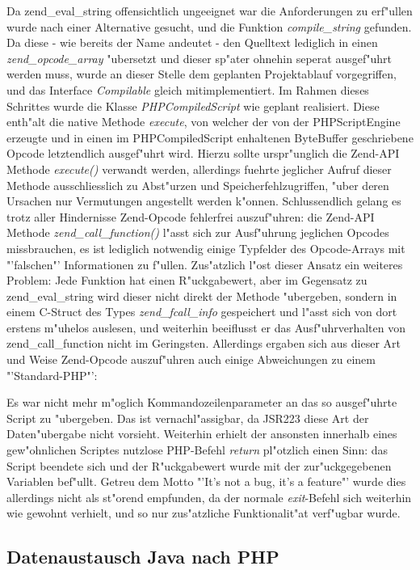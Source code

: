 Da zend\_eval\_string offensichtlich ungeeignet war die Anforderungen zu erf"ullen wurde nach einer Alternative gesucht, und
die Funktion \emph{compile\_string} gefunden. Da diese - wie bereits der Name andeutet - den Quelltext lediglich in einen
\emph{zend\_opcode\_array} "ubersetzt und dieser sp"ater ohnehin seperat ausgef"uhrt werden muss, wurde an dieser Stelle dem
geplanten Projektablauf vorgegriffen, und das Interface \emph{Compilable} gleich mitimplementiert. Im Rahmen dieses Schrittes
wurde die Klasse \emph{PHPCompiledScript} wie geplant realisiert. Diese enth"alt die native Methode \emph{execute}, von welcher
der von der PHPScriptEngine erzeugte und in einen im PHPCompiledScript enhaltenen ByteBuffer geschriebene Opcode letztendlich
ausgef"uhrt wird. Hierzu sollte urspr"unglich die Zend-API Methode \emph{execute()} verwandt werden, allerdings fuehrte jeglicher
Aufruf dieser Methode ausschliesslich zu Abst"urzen und Speicherfehlzugriffen, "uber deren Ursachen nur Vermutungen angestellt
werden k"onnen. Schlussendlich gelang es trotz aller Hindernisse Zend-Opcode fehlerfrei auszuf"uhren: die Zend-API Methode
\emph{zend\_call\_function()} l"asst sich zur Ausf"uhrung jeglichen Opcodes missbrauchen, es ist lediglich notwendig einige
Typfelder des Opcode-Arrays mit "'falschen"' Informationen zu f"ullen. Zus"atzlich l"ost dieser Ansatz ein weiteres Problem:
Jede Funktion hat einen R"uckgabewert, aber im Gegensatz zu zend\_eval\_string wird dieser nicht direkt der Methode "ubergeben,
sondern in einem C-Struct des Types \emph{zend\_fcall\_info} gespeichert und l"asst sich von dort erstens m"uhelos auslesen, und
weiterhin beeiflusst er das Ausf"uhrverhalten von zend\_call\_function nicht im Geringsten. Allerdings ergaben sich aus dieser 
Art und Weise Zend-Opcode auszuf"uhren auch einige Abweichungen zu einem "'Standard-PHP"':

Es war nicht mehr m"oglich Kommandozeilenparameter an das so ausgef"uhrte Script zu "ubergeben. Das ist vernachl"assigbar, da
JSR223 diese Art der Daten"ubergabe nicht vorsieht. Weiterhin erhielt der ansonsten innerhalb eines gew"ohnlichen Scriptes nutzlose
PHP-Befehl \emph{return} pl"otzlich einen Sinn: das Script beendete sich und der R"uckgabewert wurde mit der zur"uckgegebenen
Variablen bef"ullt. Getreu dem Motto "'It's not a bug, it's a feature"' wurde dies allerdings nicht als st"orend empfunden, da
der normale \emph{exit}-Befehl sich weiterhin wie gewohnt verhielt, und so nur zus"atzliche Funktionalit"at verf"ugbar wurde.

\subsection{Datenaustausch Java nach PHP}
\label{sec:chap1:impl:3}


